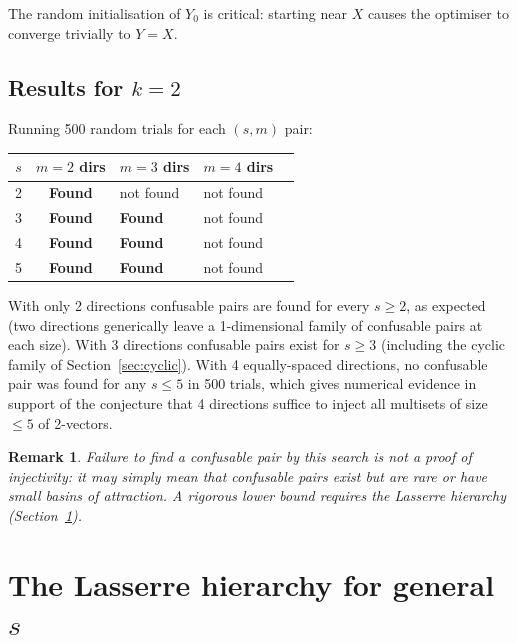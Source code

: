 \documentclass[12pt,a4paper]{article}
\newtheorem{remark}{Remark}
\begin{document}
The random initialisation of $Y_0$ is critical: starting near $X$
causes the optimiser to converge trivially to $Y = X$.

\subsection*{Results for $k = 2$}

Running 500 random trials for each $(s, m)$ pair:

\medskip
\begin{center}
\begin{tabular}{cclll}
  \hline
  $s$ & $m = 2$ dirs & $m = 3$ dirs & $m = 4$ dirs \\
  \hline
  2 & \textbf{Found} & not found & not found \\
  3 & \textbf{Found} & \textbf{Found} & not found \\
  4 & \textbf{Found} & \textbf{Found} & not found \\
  5 & \textbf{Found} & \textbf{Found} & not found \\
  \hline
\end{tabular}
\end{center}
\medskip

With only 2 directions confusable pairs are found for every $s \geq 2$,
as expected (two directions generically leave a 1-dimensional family of
confusable pairs at each size).  With 3 directions confusable pairs exist
for $s \geq 3$ (including the cyclic family of
Section~\ref{sec:cyclic}).  With 4 equally-spaced directions, no
confusable pair was found for any $s \leq 5$ in 500 trials, which gives
numerical evidence in support of the conjecture that 4 directions suffice
to inject all multisets of size $\leq 5$ of 2-vectors.

\begin{remark}
  Failure to find a confusable pair by this search is \emph{not} a proof
  of injectivity: it may simply mean that confusable pairs exist but are
  rare or have small basins of attraction.  A rigorous lower bound
  requires the Lasserre hierarchy (Section~\ref{sec:lasserre}).
\end{remark}

\section{The Lasserre hierarchy for general \texorpdfstring{$s$}{s}}
\label{sec:lasserre}
\end{document}
